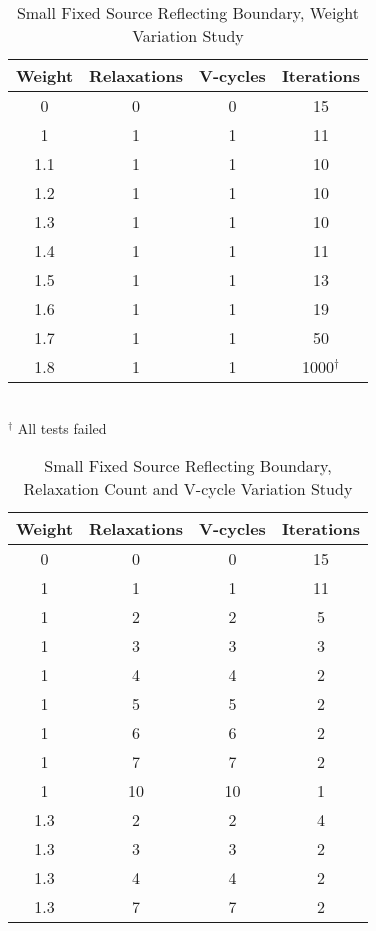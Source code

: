 \begin{table}[!h]
\caption{Small Fixed Source Reflecting Boundary, Weight Variation Study}
\begin{center}
\begin{tabular}{c c c c}
\hline
Weight & Relaxations & V-cycles & Iterations \\[0.5ex]
\hline
0    & 0 & 0 & 15 \\
1    & 1 & 1 & 11 \\
1.1 & 1 & 1 & 10 \\
1.2 & 1 & 1 & 10 \\
1.3 & 1 & 1 & 10 \\
1.4 & 1 & 1 & 11 \\
1.5 & 1 & 1 & 13 \\
1.6 & 1 & 1 & 19 \\
1.7 & 1 & 1 & 50 \\
1.8 & 1 & 1 & 1000$^{\dagger}$ \\
\hline 
\end{tabular} \\
$^{\dagger}$ All tests failed
\end{center}
\label{table:FxdSrcTstReflWeight}
\end{table}

\begin{table}[!h]
\caption{Small Fixed Source Reflecting Boundary, Relaxation Count and V-cycle Variation Study}
\begin{center}
\begin{tabular}{c c c c}
\hline
Weight & Relaxations & V-cycles & Iterations \\[0.5ex]
\hline
0  & 0 & 0 & 15 \\
1 & 1 & 1 & 11 \\
1 & 2 & 2 & 5 \\
1 & 3 & 3 & 3 \\
1 & 4 & 4 & 2 \\
1 & 5 & 5 & 2 \\
1 & 6 & 6 & 2 \\
1 & 7 & 7 & 2 \\
1 & 10 & 10 & 1 \\
\hline
1.3 & 2 & 2 & 4 \\
1.3 & 3 & 3 & 2 \\
1.3 & 4 & 4 & 2 \\
1.3 & 7 & 7 & 2 \\
\hline 
\end{tabular}
\end{center}
\label{table:FxdSrcTstReflRV}
\end{table}

